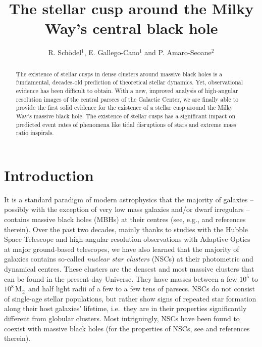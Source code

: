 \documentclass[a4paper]{jpconf}
\begin{document}
\title{The stellar cusp around the Milky Way's central black hole}

\author{R. Sch{\"o}del$^{1}$, E. Gallego-Cano$^{1}$ and P. Amaro-Seoane$^{2}$}

\address{$^{1}$Instituto de Astrof{\'i}sica de Andaluc{\'i}a (CSIC),
  Glorieta de la Astronom{\'i}a s/n, 18008 Granada, Spain\\
  $^{2}$Institut de Ci{\`e}ncies de l'Espai (CSIC-IEEC) at Campus UAB, Carrer de Can Magrans s/n 08193 Barcelona, Spain\\
Institute of Applied Mathematics, Academy of Mathematics and Systems Science, CAS, Beijing 100190, China\\
Kavli Institute for Astronomy and Astrophysics, Beijing 100871, China\\
Zentrum f{\"u}r Astronomie und Astrophysik, TU Berlin, Hardenbergstra{\ss}e 36, 10623 Berlin, Germany
}


\begin{abstract}
  The existence of stellar cusps in dense clusters around massive
  black holes is a fundamental, decades-old prediction of theoretical
  stellar dynamics. Yet, observational evidence has been difficult to
  obtain. With a new, improved analysis of high-angular resolution
  images of the central parsecs of the Galactic Center, we are finally
  able to provide the first solid evidence for the existence of a
  stellar cusp around the Milky Way's massive black hole. The
  existence of stellar cusps has a significant impact on predicted
  event rates of phenomena like tidal disruptions of stars and extreme
  mass ratio inspirals.
\end{abstract}

\section{Introduction}

It is a standard paradigm of modern astrophysics that the majority of
galaxies -- possibly with the exception of very low mass galaxies and/or dwarf
irregulars -- contains massive black holes (MBHs) at their centres (see,
e.g., \cite{Gultekin:2009fk} and references therein). Over the past two
decades, mainly thanks to studies with the Hubble Space Telescope and
high-angular resolution observations with Adaptive Optics at major
ground-based telescopes, we have also learned that the majority of
galaxies contains so-called {\it nuclear star clusters} (NSCs) at their
photometric and dynamical centres. These clusters are the densest and
most massive clusters that can be found in the present-day
Universe. They have masses between a few $10^{5}$ to
$10^{8}$\,M$_{\odot}$ and half light radii of a few to a few tens of
parsecs. NSCs do not consist of single-age stellar populations, but
rather show signs of repeated star formation along their host
galaxies' lifetime, i.e.\ they are in their properties significantly
different from globular clusters. Most intriguingly, NSCs have been
found to coexist with massive black holes (for the properties of NSCs,
see \cite{Boker:2010ys,Georgiev:2014ve,Georgiev:2016nr} and references therein). 
\end{document}
